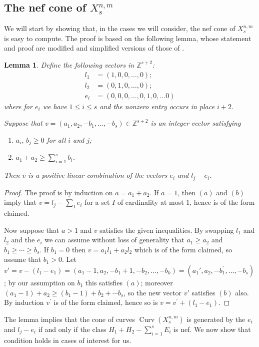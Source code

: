 \documentclass[a4paper,11pt]{article}
\newtheorem{lemma}[theorem]{Lemma}
\newcommand{\ZZ}{\mathbb Z}
\newcommand{\Curv}{\operatorname{Curv}}
\newcommand{\blowup}[3]{X^{#1,#2}_{#3}}
\begin{document}
\subsection{The nef cone of \texorpdfstring{$X^{n,m}_s$}{X{n,m}}}
We will start by showing that, in the cases we will consider, the nef cone of $X^{n,m}_s$ is easy to compute. The proof is based on the following lemma, whose statement and proof are modified and simplified versions of those of \cite[Lemma 2.6]{CLO16}. 
\begin{lemma}\label{lemma-clo}
  Define the following vectors in $\ZZ^{s+2}$:
  \begin{align*}
    l_1 &= \left(1,0,0,\ldots,0\right);\\
    l_2 &= \left(0,1,0,\ldots,0\right);\\
    e_i &= \left(0,0,0,\ldots,0,1,0,\ldots 0\right)
  \end{align*}
  where for $e_i$ we have $1 \leq i \leq s$ and the nonzero entry occurs in place $i+2$.
  
  Suppose that $v=(a_1,a_2,-b_1,\ldots,-b_s) \in \ZZ^{s+2}$ is an integer vector satisfying
  \begin{enumerate}
  \item[(a)] $a_i, \, b_j \geq 0$ for all $i$ and $j$;
  \item[(b)] $a_1+a_2 \geq \sum_{i=1}^s b_i$.
  \end{enumerate}
Then $v$ is a positive linear combination of the vectors $e_i$ and $l_j-e_i$. 
\end{lemma}
\begin{proof}
  The proof is by induction on $a=a_1+a_2$. If $a=1$, then $(a)$ and $(b)$ imply that $v=l_j-\sum_I e_i$ for a set $I$ of cardinality at most 1, hence is of the form claimed.

Now suppose that $a>1$ and $v$ satisfies the given inequalities. By swapping $l_1$ and $l_2$ and the $e_i$ we can assume without loss of generality that $a_1 \geq a_2$ and $b_1 \geq \cdots \geq b_s$. If $b_1=0$ then $v=a_1l_1+a_2l_2$ which is of the form claimed, so assume that $b_1>0$. Let $v'=v-(l_1-e_1)=(a_1-1,a_2,-b_1+1,-b_2,\ldots,-b_k)=(a_1',a_2,-b_1^\prime,\ldots,-b_s)$; by our assumption on $b_1$ this satisfies $(a)$; moreover $(a_1-1)+a_2 \geq (b_1-1)+b_2+\cdots b_s$, so the new vector $v\prime$ satisfies $(b)$ also. By induction $v^\prime$ is of the form claimed, hence so is $v=v^\prime + (l_1-e_1)$.   
\end{proof}
The lemma implies that the cone of curves $\Curv(\blowup{n}{m}{s})$ is generated by the $e_i$ and $l_j-e_i$ if and only if the class $H_1+H_2-\sum_{i=1}^s E_i$ is nef. We now show that condition holds in cases of interest for us.
\end{document}
